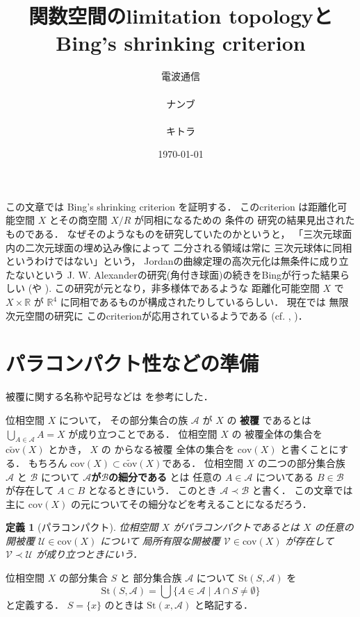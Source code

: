 \documentclass[leqno, a4paper, 12pt]{jsarticle}
\title{
関数空間のlimitation topologyと\\
Bing's shrinking criterion
}
\author{電波通信\!\!\!\!\!\!\!\!\!\!\!\!\rule{10mm}{2mm}ナンブ\rule{5mm}{5mm}キトラ\!\!\rule{30mm}{5mm}}
\date{\today}
\numberwithin{equation}{section}
\newtheorem{df}[thm]{定義}
\newcommand{\rr}{\mathbb{R}}
\newcommand{\yocov}[1]{\mathrm{cov}(#1)}
\newcommand{\yocovq}[1]{\widetilde{\mathrm{cov}}(#1)}
\newcommand{\yocovfont}[1]{\mathscr{#1}}
\newcommand{\yofine}{\prec}
\newcommand{\yost}[1]{\mathrm{St}(#1)}
\begin{document}
\maketitle





この文章では
Bing's shrinking criterion 
を証明する．
このcriterion
は距離化可能空間
$X$
とその商空間
$X/R$
が同相になるための
条件の
研究の結果見出されたものである．
なぜそのようなものを研究していたのかというと，
「三次元球面内の二次元球面の埋め込み像によって
二分される領域は常に
三次元球体に同相というわけではない」という，
Jordanの曲線定理の高次元化は無条件に成り立たないという
J. W. Alexanderの研究(角付き球面)の続きをBingが行った結果らしい
(\cite{zbMATH03078238}や
\cite{zbMATH03128022}).
この研究が元となり，非多様体であるような
距離化可能空間
$X$
で
$X\times \rr$
が
$\rr^{4}$
に同相であるものが構成されたりしているらしい．
現在では
無限次元空間の研究に
このcriterionが応用されているようである
(cf. \cite{zbMATH01612786}
\cite{MR3099433}, 
\cite{MR4179591})．

\tableofcontents


\section{パラコンパクト性などの準備}

被覆に関する名称や記号などは
\cite{kiiti}
を参考にした．

位相空間
$X$
について，
その部分集合の族
$\yocovfont{A}$
が
$X$
の
\textbf{被覆}
であるとは
$\bigcup_{A\in \yocovfont{A}}A=X$
が成り立つことである．
位相空間
$X$
の
被覆全体の集合を
$\yocovq{X}$
とかき，
$X$
の
からなる被覆
全体の集合を
$\yocov{X}$
と書くことにする．
もちろん
$\yocov{X}\subset \yocovq{X}$である．
位相空間
$X$
の二つの部分集合族
$\yocovfont{A}$
と
$\yocovfont{B}$
について
\textbf{$\yocovfont{A}$が$\yocovfont{B}$の細分である}
とは
任意の
$A\in \yocovfont{A}$
についてある
$B\in \yocovfont{B}$
が存在して
$A\subset B$
となるときにいう．
このとき
$\yocovfont{A}\yofine \yocovfont{B}$
と書く．
この文章では主に
$\yocov{X}$
の元についてその細分などを考えることになるだろう．





\begin{df}[パラコンパクト]
位相空間
$X$
がパラコンパクトであるとは
$X$
の任意の開被覆
$\yocovfont{U}\in \yocov{X}$
について
局所有限な開被覆
$\yocovfont{V}\in \yocov{X}$
が存在して
$\yocovfont{V}\yofine \yocovfont{U}$
が成り立つときにいう．
\end{df}
位相空間
$X$
の部分集合
$S$
と
部分集合族
$\yocovfont{A}$
について
$\yost{S, \yocovfont{A}}$
を
\[
\yost{S, \yocovfont{A}}
=
\bigcup\{A\in \yocovfont{A}\mid A\cap S\neq \emptyset\}
\]
と定義する．
$S=\{x\}$
のときは
$\yost{x, \yocovfont{A}}$
と略記する．
\end{document}
